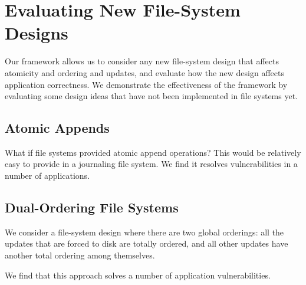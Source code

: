 \section{Evaluating New File-System Designs}
\label{sec-fs-what-if}

Our framework allows us to consider any new file-system design that affects
atomicity and ordering and updates, and evaluate how the new design affects
application correctness. We demonstrate the effectiveness of the framework by
evaluating some design ideas that have not been implemented in file systems
yet. 

\subsection{Atomic Appends}
What if file systems provided atomic append operations? This would be
relatively easy to provide in a journaling file system. We find it resolves
vulnerabilities in a number of applications.

\subsection{Dual-Ordering File Systems}
We consider a file-system design where there are two global orderings: all the
updates that are forced to disk are totally ordered, and all other updates have
another total ordering among themselves.

We find that this approach solves a number of application vulnerabilities. 



